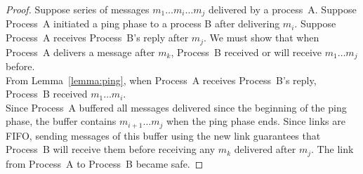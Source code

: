 \begin{proof}
  Suppose series of messages $m_1 \ldots m_i \ldots m_j$ delivered by a
  process~A. Suppose Process~A initiated a ping phase to a process B after
  delivering $m_i$. Suppose Process~A receives Process~B's reply after $m_j$.
  We must show that when Process~A delivers a message after $m_k$, Process~B
  received or will receive $m_1 \ldots m_j$ before. \\
  From Lemma~\ref{lemma:ping}, when Process~A receives Process~B's reply,
  Process~B received $m_1 \ldots m_i$. \\
  Since Process~A buffered all messages delivered since the beginning of the
  ping phase, the buffer contains $m_{i+1} \ldots m_j$ when the ping phase ends.
  Since links are FIFO, sending messages of this buffer using the new link
  guarantees that Process~B will receive them before receiving any $m_k$
  delivered after $m_j$. The link from Process~A to Process~B became safe.
\end{proof}


